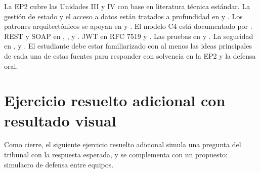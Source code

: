 La EP2 cubre las Unidades III y IV con base en literatura técnica
estándar. La gestión de estado y el acceso a datos están tratados a
profundidad en \cite{fowler2002patterns} y \cite{kleppmann2017designing}.
Los patrones arquitectónicos se apoyan en \cite{bass2021software} y
\cite{richards2020fundamentals}. El modelo C4 está documentado por
\cite{brown2023c4}. REST y SOAP en \cite{fielding2000rest},
\cite{richardson2007restful}, \cite{alonso2010webservice} y
\cite{richardson2007restful}. JWT en RFC 7519 \cite{jones2015jwt} y
\cite{jones2015jwt}. Las pruebas en \cite{martin2008clean} y
\cite{martin2017clean}. La seguridad en \cite{owasp2021top10},
\cite{verizon2025dbir} y \cite{ortega2022securecoding}. El
estudiante debe estar familiarizado con al menos las ideas
principales de cada una de estas fuentes para responder con solvencia
en la EP2 y la defensa oral.

\section{Ejercicio resuelto adicional con resultado visual}

Como cierre, el siguiente ejercicio resuelto adicional
simula una pregunta del tribunal con la respuesta esperada, y se
complementa con un propuesto: simulacro de defensa entre equipos.


